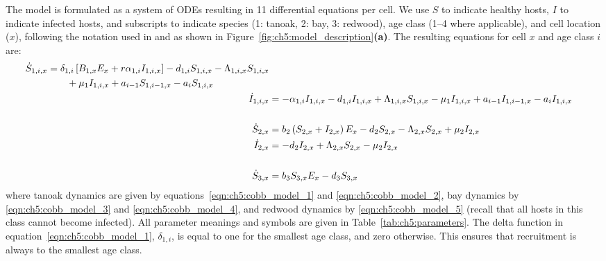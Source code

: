 The model is formulated as a system of ODEs resulting in 11 differential equations per cell. We use $S$ to indicate healthy hosts, $I$ to indicate infected hosts, and subscripts to indicate species (1: tanoak, 2: bay, 3: redwood), age class (1--4 where applicable), and cell location ($x$), following the notation used in \citet{cobb_ecosystem_2012} and as shown in Figure~\ref{fig:ch5:model_description}\textbf{(a)}. The resulting equations for cell $x$ and age class $i$ are:
\begin{subequations}\label{eqn:ch5:cobb_model}
\begin{align}
    \begin{split}
        \dot{S}_{1,i,x} &= \delta_{1,i}\left[B_{1,x}E_x+r\alpha_{1,i}I_{1,i,x}\right] - d_{1,i}S_{1,i,x} - \Lambda_{1,i,x}S_{1,i,x} \\
        &{}\quad\quad+ \mu_1I_{1,i,x} + a_{i-1}S_{1,i-1,x} - a_iS_{1,i,x} \label{eqn:ch5:cobb_model_1}
    \end{split}\\
    \dot{I}_{1,i,x} &= -\alpha_{1,i}I_{1,i,x} - d_{1,i}I_{1,i,x} + \Lambda_{1,i,x}S_{1,i,x} - \mu_1I_{1,i,x} + a_{i-1}I_{1,i-1,x} - a_iI_{1,i,x} \label{eqn:ch5:cobb_model_2} \\\notag\\
    \dot{S}_{2,x} &= b_2\left(S_{2,x}+I_{2,x}\right)E_x - d_2S_{2,x} - \Lambda_{2,x}S_{2,x} + \mu_2I_{2,x} \label{eqn:ch5:cobb_model_3} \\
    \dot{I}_{2,x} &= - d_2I_{2,x} + \Lambda_{2,x}S_{2,x} - \mu_2I_{2,x}\label{eqn:ch5:cobb_model_4} \\\notag\\
    \dot{S}_{3,x} &= b_3S_{3,x}E_x - d_3S_{3,x} \label{eqn:ch5:cobb_model_5}
\end{align}
\end{subequations}
where tanoak dynamics are given by equations~\ref{eqn:ch5:cobb_model_1} and \ref{eqn:ch5:cobb_model_2}, bay dynamics by \ref{eqn:ch5:cobb_model_3} and \ref{eqn:ch5:cobb_model_4}, and redwood dynamics by \ref{eqn:ch5:cobb_model_5} (recall that all hosts in this class cannot become infected). All parameter meanings and symbols are given in Table~\ref{tab:ch5:parameters}. The delta function in equation~\ref{eqn:ch5:cobb_model_1}, $\delta_{1,i}$, is equal to one for the smallest age class, and zero otherwise. This ensures that recruitment is always to the smallest age class.

